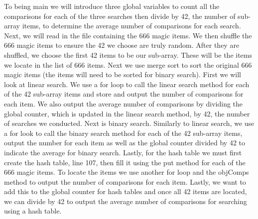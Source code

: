 \documentclass{article}
\begin{document}
To being main we will introduce three global variables to count all the comparisons for each of the three searches then divide by 42, the number of sub-array items, to determine the average number of comparisons for each search. Next, we will read in the file containing the 666 magic items. We then shuffle the 666 magic items to ensure the 42 we choose are truly random. After they are shuffled, we choose the first 42 items to be our sub-array. These will be the items we locate in the list of 666 items. Next we use merge sort to sort the original 666 magic items (the items will need to be sorted for binary search). First we will look at linear search. We use a for loop to call the linear search method for each of the 42 sub-array items and store and output the number of comparisons for each item. We also output the average number of comparisons by dividing the global counter, which is updated in the linear search method, by 42, the number of searches we conducted. Next is binary search. Similarly to linear search, we use a for look to call the binary search method for each of the 42 sub-array items, output the number for each item as well as the global counter divided by 42 to indicate the average for binary search. Lastly, for the hash table we must first create the hash table, line 107, then fill it using the put method for each of the 666 magic items. To locate the items we use another for loop and the objComps method to output the number of comparisons for each item. Lastly, we want to add this to the global counter for hash tables and once all 42 items are located, we can divide by 42 to output the average number of comparisons for searching using a hash table. 

\large
\end{document}
